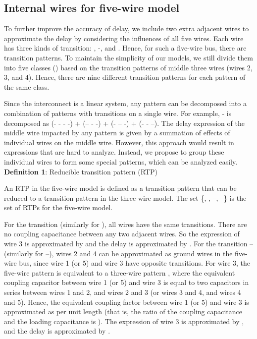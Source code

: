 \documentclass[10pt,journal]{IEEEtran}
\begin{document}
\subsection{Internal wires for five-wire model}\label{sec:5w}
To further improve the accuracy of delay, we include two extra adjacent wires to approximate the delay by considering the influences of all five wires. Each wire has three kinds of transition: , -, and . Hence, for such a five-wire bus, there are  transition patterns. To maintain the simplicity of our models, we still divide them into five classes () based on the transition patterns of middle three wires (wires 2, 3, and 4). Hence, there are nine different transition patterns for each pattern of the same class.

Since the interconnect is a linear system, any pattern can be decomposed into a combination of patterns with transitions on a single wire. For example, - is decomposed as (- - - -) +  (-- - -) + (- -- -) + (- - --). The delay expression of the middle wire impacted by any pattern is given by a summation of effects of individual wires on the middle wire.
However, this approach would result in expressions that are hard to analyze. Instead, we propose to group these individual wires to form some special patterns, which can be analyzed easily.\\

\textbf{Definition 1}: Reducible transition pattern (RTP)

An RTP in the five-wire model is defined as a transition pattern that can be reduced to a transition pattern in the three-wire model. The set \{, , --, --\} is the set of RTPs for the five-wire model.

For the transition  (similarly for ), all wires have the same transitions. There are no coupling capacitance between any two adjacent wires. So the expression of wire 3 is approximated by
 and the delay is approximated by . For the transition -- (similarly for --), wires 2 and 4 can be approximated as ground wires in the five-wire bus, since wire 1 (or 5) and wire 3 have opposite transitions. For wire 3, the five-wire pattern is equivalent to a three-wire pattern , where the equivalent coupling capacitor between wire 1 (or 5) and wire 3 is equal to two capacitors in series between wires 1 and 2, and wires 2 and 3 (or wires 3 and 4, and wires 4 and 5).
Hence, the equivalent coupling factor between wire 1 (or 5) and wire 3 is approximated as  per unit length (that is, the ratio of the coupling capacitance and the loading capacitance is ). The expression of wire 3 is approximated by , and the delay is approximated by .\\
\end{document}
